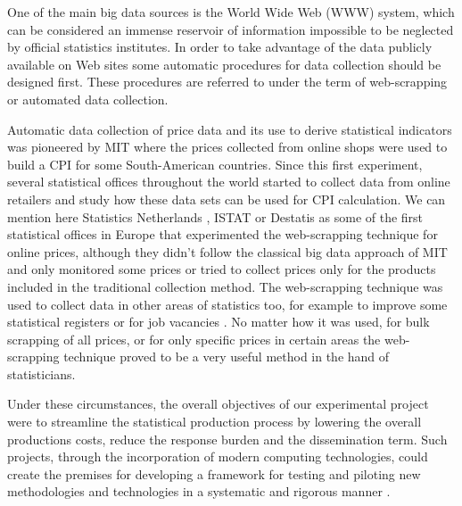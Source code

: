 \documentclass[]{article}
\begin{document}
One of the main big data sources is the World Wide Web (WWW) system, which can be considered an immense reservoir of information impossible to be neglected
by official statistics institutes. In order to take advantage of the data publicly available on Web sites some automatic procedures for data collection 
should be designed first. These procedures are referred to under the term of web-scrapping or automated data collection.

Automatic data collection of price data and its use to derive statistical indicators was pioneered by MIT \cite{MIT} where the prices collected 
from online shops were used to build a CPI for some South-American countries. Since this first experiment, several
statistical offices throughout the world started to collect data from online retailers and study how these data sets can be used
for CPI calculation. We can mention here Statistics Netherlands \cite{cbs}, ISTAT \cite{polidoro}  
or Destatis \cite{bruner} as some of the first statistical offices in Europe that experimented the web-scrapping technique for online prices, 
although they didn't follow the classical big data approach of MIT and only monitored some prices or tried to collect prices
only for the products included in the traditional collection method. The web-scrapping technique was used to collect data in other areas
of statistics too, for example to improve some statistical registers \cite{barcoli} or for job vacancies \cite{swier2}.
No matter how it was used, for bulk scrapping of all prices, or for only specific prices in certain areas \cite{cbs2} the web-scrapping technique proved to be a very useful method in the hand of statisticians.


Under these circumstances, the overall objectives of our experimental project were to streamline the statistical production process by 
lowering the overall productions costs, reduce the response burden and the dissemination term. Such projects, through the incorporation 
of modern computing technologies, could create the premises for developing a framework for testing and piloting new methodologies 
and technologies in a systematic and rigorous manner \cite{ons2017}. 
\end{document}
